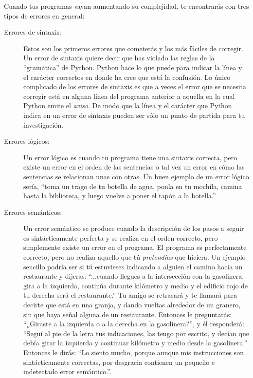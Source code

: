 Cuando tus programas vayan aumentando su complejidad, te encontrarás con
tres tipos de errores en general:

\begin{description}

\item[Errores de sintaxis:] Estos son los primeros errores que cometerás y los más
fáciles de corregir. Un error de sintaxis quiere decir que has violado las reglas de la
``gramática'' de Python. Python hace lo que puede para indicar la línea y el carácter
correctos en donde ha cree que está la confusión. Lo único complicado de los errores de
sintaxis es que a veces el error que se necesita corregir está en alguna línea del
programa anterior a aquella en la cual Python emite el {\em aviso}. De modo que la línea
y el carácter que Python indica en un error de sintaxis pueden ser sólo un punto de
partida para tu investigación.  

\item[Errores lógicos:] Un error lógico es cuando tu programa tiene una sintaxis correcta,
pero existe un error en el orden de las sentencias o tal vez un error en cómo las
sentencias se relacionan unas con otras.
Un buen ejemplo de un error lógico sería, ``toma un trago de tu botella de agua, ponla
en tu mochila, camina hasta la biblioteca, y luego vuelve a poner el tapón a la botella.'' 

\item[Errores semánticos:] Un error semántico se produce cuando la descripción de los
pasos a seguir es sintácticamente perfecta y se realiza en el orden correcto, pero
simplemente existe un error en el programa. El programa es perfectamente correcto, pero
no realiza aquello que tú {\em pretendías} que hiciera. Un ejemplo sencillo podría ser
si tú estuvieses indicando a alguien el camino hacia un restaurante y dijeras:
``...cuando llegues a la intersección con la gasolinera, gira a la izquierda, continúa
durante kilómetro y medio y el edificio rojo de tu derecha será el restaurante.'' Tu amigo
se retrasará y te llamará para decirte que está en una granja, y dando vueltas alrededor
de un granero, sin que haya señal alguna de un restaurante.
Entonces le preguntarás: ``¿Giraste a la izquierda o a la derecha en la gasolinera?'', y él
responderá: ``Seguí al pie de la letra tus indicaciones, las tengo por escrito, y decían
que debía girar la izquierda y continuar kilómetro y medio desde la gasolinera.'' Entonces
le dirás: ``Lo siento mucho, porque aunque mis instrucciones son sintácticamente
correctas, por desgracia contienen un pequeño e indetectado error semántico.''.

\end{description}

